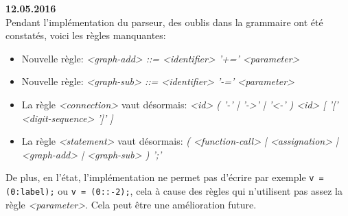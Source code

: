 \documentclass[french]{article}
\begin{document}
		\textbf{12.05.2016}\\
		Pendant l'implémentation du parseur, des oublis dans la grammaire ont été constatés, voici les règles manquantes:
		\begin{itemize}
			\item Nouvelle règle: \textit{<graph-add> ::= <identifier> '+=' <parameter>}
			\item Nouvelle règle: \textit{<graph-sub> ::= <identifier> '-=' <parameter>}
			\item La règle \textit{<connection>} vaut désormais: \textit{<id> ( '\textendash-' | '->' | '<-' ) <id> [ '[' <digit-sequence> ']' ]}
			\item La règle \textit{<statement>} vaut désormais: \textit{( <function-call> | <assignation> | <graph-add> | <graph-sub> ) ';'}
		\end{itemize}
		De plus, en l'état, l'implémentation ne permet pas d'écrire par exemple \texttt{v = (0:label);} ou \texttt{v = (0::-2);}, cela à cause des règles qui n'utilisent pas assez la règle \textit{<parameter>}. Cela peut être une amélioration future.
		
\end{document}
